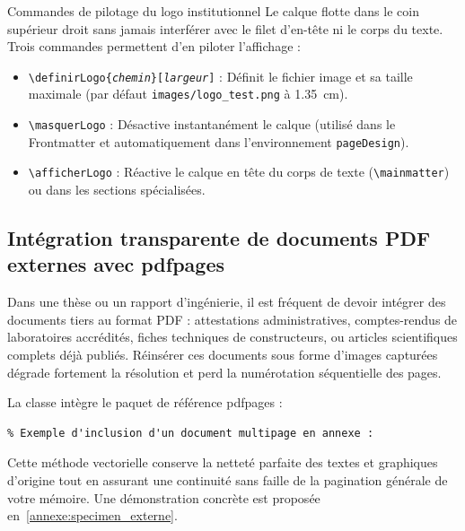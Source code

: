 \begin{boiteSynthese}{Commandes de pilotage du logo institutionnel}
  Le calque flotte dans le coin supérieur droit sans jamais interférer avec le filet d'en-tête ni le corps du texte. Trois commandes permettent d'en piloter l'affichage :
  \begin{itemize}
    \item \texttt{\textbackslash definirLogo\{\emph{chemin}\}[\emph{largeur}]} : Définit le fichier image et sa taille maximale (par défaut \texttt{images/logo\_test.png} à \qty{1.35}{\centi\meter}).
    \item \texttt{\textbackslash masquerLogo} : Désactive instantanément le calque (utilisé dans le Frontmatter et automatiquement dans l'environnement \texttt{pageDesign}).
    \item \texttt{\textbackslash afficherLogo} : Réactive le calque en tête du corps de texte (\texttt{\textbackslash mainmatter}) ou dans les sections spécialisées.
  \end{itemize}
\end{boiteSynthese}

\subsection{Intégration transparente de documents PDF externes avec \textsf{pdfpages}}
\label{subsec:pdfpages_externes}

Dans une thèse ou un rapport d'ingénierie, il est fréquent de devoir intégrer des documents tiers au format PDF :
attestations administratives, comptes-rendus de laboratoires accrédités, fiches techniques de constructeurs, ou articles scientifiques complets déjà publiés.
Réinsérer ces documents sous forme d'images capturées dégrade fortement la résolution et perd la numérotation séquentielle des pages.

La classe intègre le paquet de référence \textsf{pdfpages} :
\begin{verbatim}
% Exemple d'inclusion d'un document multipage en annexe :

\end{verbatim}
Cette méthode vectorielle conserve la netteté parfaite des textes et graphiques d'origine tout en assurant une continuité sans faille de la pagination générale de votre mémoire.
Une démonstration concrète est proposée en~\cref{annexe:specimen_externe}.

